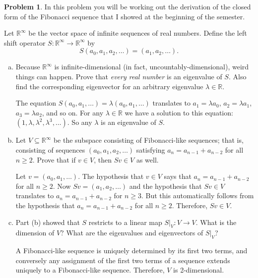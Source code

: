 \documentclass[11pt,oneside]{amsart}
\theoremstyle{definition}
\newtheorem{problem}{Problem}
\newcommand{\bR}{\mathbb{R}}
\begin{document}
    \begin{problem}
        In this problem you will be working out the derivation of the closed form of the Fibonacci sequence that I showed at the beginning of the semester.
        
        Let $\bR^\infty$ be the vector space of infinite sequences of real numbers. Define the left shift operator $S\colon \bR^\infty\to\bR^\infty$ by
        \[S(a_0,a_1,a_2,\dots)=(a_1,a_2,\dots).\]
        \begin{enumerate}[(a)]
            \item Because $\bR^\infty$ is infinite-dimensional (in fact, uncountably-dimensional), weird things can happen. Prove that \emph{every real number} is an eigenvalue of $S$. Also find the corresponding eigenvector for an arbitrary eigenvalue $\lambda\in\bR$.
            \begin{solution}
                The equation $S(a_0,a_1,\dots)=\lambda(a_0,a_1,\dots)$ translates to $a_1=\lambda a_0$, $a_2=\lambda a_1$, $a_3=\lambda a_2$, and so on. For any $\lambda\in\bR$ we have a solution to this equation: $(1,\lambda,\lambda^2,\lambda^3,\dots)$. So any $\lambda$ is an eigenvalue of $S$.
            \end{solution}
            \item Let $V\subseteq\bR^\infty$ be the subspace consisting of Fibonacci-like sequences; that is, consisting of sequences $(a_0,a_1,a_2,\dots)$ satisfying $a_n=a_{n-1}+a_{n-2}$ for all $n\geq 2$. Prove that if $v\in V$, then $Sv\in V$ as well.
            \begin{solution}
                Let $v=(a_0,a_1,\dots)$. The hypothesis that $v\in V$ says that $a_n=a_{n-1}+a_{n-2}$ for all $n\geq 2$. Now $Sv=(a_1,a_2,\dots)$ and the hypothesis that $Sv\in V$ translates to $a_n=a_{n-1}+a_{n-2}$ for $n\geq 3$. But this automatically follows from the hypothesis that $a_n=a_{n-1}+a_{n-2}$ for all $n\geq 2$. Therefore, $Sv\in V$.
            \end{solution}
            \item Part (b) showed that $S$ restricts to a linear map $S|_V\colon V\to V$. What is the dimension of $V$? What are the eigenvalues and eigenvectors of $S|_V$?
            \begin{solution}
                A Fibonacci-like sequence is uniquely determined by its first two terms, and conversely any assignment of the first two terms of a sequence extends uniquely to a Fibonacci-like sequence. Therefore, $V$ is 2-dimensional.


\end{solution}
\end{enumerate}
\end{problem}
\end{document}
